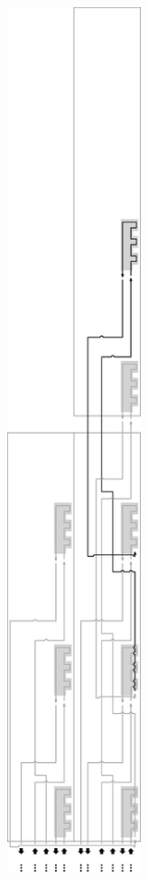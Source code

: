 \begin{figure}[H]\ContinuedFloat
    \centering
    \begin{subfigure}[t]{0.43\textwidth}
        \centering
        \includegraphics[width=0.43\textwidth]{counter_read_digit2_return_read_digit3_general_case3_middle_level}

\end{subfigure}
\end{figure}
